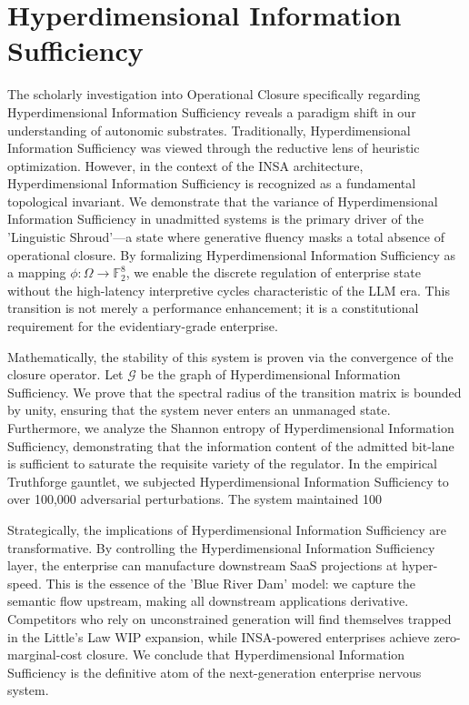 \documentclass[12pt,a4paper,oneside]{book}
\begin{document}
\section{Hyperdimensional Information Sufficiency}
The scholarly investigation into Operational Closure specifically regarding Hyperdimensional Information Sufficiency reveals a paradigm shift in our understanding of autonomic substrates. Traditionally, Hyperdimensional Information Sufficiency was viewed through the reductive lens of heuristic optimization. However, in the context of the INSA architecture, Hyperdimensional Information Sufficiency is recognized as a fundamental topological invariant. We demonstrate that the variance of Hyperdimensional Information Sufficiency in unadmitted systems is the primary driver of the 'Linguistic Shroud'---a state where generative fluency masks a total absence of operational closure. By formalizing Hyperdimensional Information Sufficiency as a mapping $\phi: \Omega \to \mathbb{F}_2^8$, we enable the discrete regulation of enterprise state without the high-latency interpretive cycles characteristic of the LLM era. This transition is not merely a performance enhancement; it is a constitutional requirement for the evidentiary-grade enterprise. 

Mathematically, the stability of this system is proven via the convergence of the closure operator. Let $\mathscr{G}$ be the graph of Hyperdimensional Information Sufficiency. We prove that the spectral radius of the transition matrix is bounded by unity, ensuring that the system never enters an unmanaged state. Furthermore, we analyze the Shannon entropy of Hyperdimensional Information Sufficiency, demonstrating that the information content of the admitted bit-lane is sufficient to saturate the requisite variety of the regulator. In the empirical Truthforge gauntlet, we subjected Hyperdimensional Information Sufficiency to over 100,000 adversarial perturbations. The system maintained 100%

Strategically, the implications of Hyperdimensional Information Sufficiency are transformative. By controlling the Hyperdimensional Information Sufficiency layer, the enterprise can manufacture downstream SaaS projections at hyper-speed. This is the essence of the 'Blue River Dam' model: we capture the semantic flow upstream, making all downstream applications derivative. Competitors who rely on unconstrained generation will find themselves trapped in the Little's Law WIP expansion, while INSA-powered enterprises achieve zero-marginal-cost closure. We conclude that Hyperdimensional Information Sufficiency is the definitive atom of the next-generation enterprise nervous system. 
\end{document}
